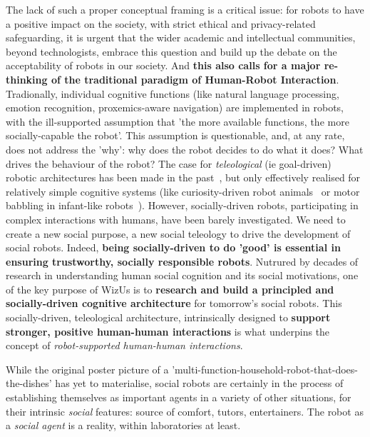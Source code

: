 \documentclass[11pt,a4paper]{report}
\newcommand{\project}{WizUs\xspace}
\begin{document}
The lack of such a proper conceptual framing is a critical issue: for robots to
have a positive impact on the society, with strict ethical and privacy-related
safeguarding, it is urgent that the wider academic and intellectual communities,
beyond technologists, embrace this question and build up the debate on the
acceptability of robots in our society. And \textbf{this also calls for a major
re-thinking of the traditional paradigm of Human-Robot Interaction}.
Tradionally, individual cognitive functions (like natural language processing,
emotion recognition, proxemics-aware navigation) are implemented in robots, with
the ill-supported assumption that 'the more available functions, the more
socially-capable the robot'. This assumption is questionable, and, at any rate,
does not address the 'why': why does the robot decides to do what it does? What
drives the behaviour of the robot? The case for \emph{teleological} (ie
goal-driven) robotic architectures has been made in the
past~\cite{wrede2012towards}, but only effectively realised for relatively
simple cognitive systems (like curiosity-driven robot
animals~\cite{oudeyer2005playground} or motor babbling in infant-like
robots~\cite{forestier2017unified}). However, socially-driven robots,
participating in complex interactions with humans, have been barely
investigated. We need to create a new social purpose, a new social teleology to
drive the development of social robots.  Indeed, \textbf{being socially-driven
to do 'good' is essential in ensuring trustworthy, socially responsible robots}.
Nutrured by decades of research in understanding human social cognition and its
social motivations, one of the key purpose of \project is to \textbf{research
and build a principled and socially-driven cognitive architecture} for
tomorrow's social robots. This socially-driven, teleological architecture,
intrinsically designed to \textbf{support stronger, positive human-human
interactions} is what underpins the concept of \emph{robot-supported human-human
interactions}.


While the original poster picture of a
'multi-function-household-robot-that-does-the-dishes' has yet to materialise,
social robots are certainly in the process of establishing themselves as
important agents in a variety of other situations, for their intrinsic
\emph{social} features: source of comfort, tutors, entertainers. The robot as a
\emph{social agent} is a reality, within laboratories at least.
\end{document}
